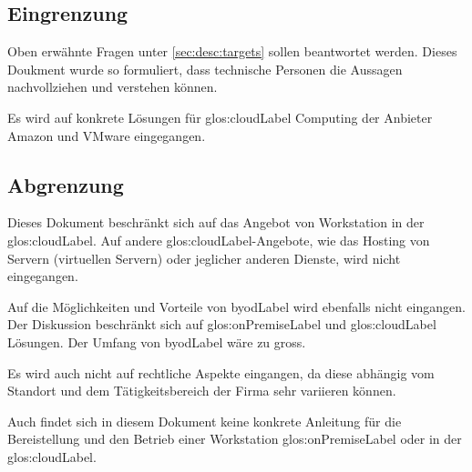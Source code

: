 \subsection{Eingrenzung}

Oben erwähnte Fragen unter \cref{sec:desc:targets} sollen beantwortet werden.
Dieses Doukment wurde so formuliert, dass technische Personen die Aussagen nachvollziehen und verstehen können.

Es wird auf konkrete Lösungen für \Gls{glos:cloudLabel} Computing der Anbieter Amazon und VMware eingegangen.

\subsection{Abgrenzung}
Dieses Dokument beschränkt sich auf das Angebot von Workstation in der \Gls{glos:cloudLabel}. Auf andere \Gls{glos:cloudLabel}-Angebote, wie das Hosting von Servern (virtuellen Servern) oder jeglicher anderen Dienste, wird nicht eingegangen.

Auf die Möglichkeiten und Vorteile von \Gls{byodLabel} wird ebenfalls nicht eingangen. Der Diskussion beschränkt sich auf \gls{glos:onPremiseLabel} und \Gls{glos:cloudLabel} Lösungen. Der Umfang von \Gls{byodLabel} wäre zu gross.

Es wird auch nicht auf rechtliche Aspekte eingangen, da diese abhängig vom Standort und dem Tätigkeitsbereich der Firma sehr variieren können.

Auch findet sich in diesem Dokument keine konkrete Anleitung für die Bereistellung und den Betrieb einer Workstation \gls{glos:onPremiseLabel} oder in der \Gls{glos:cloudLabel}.

